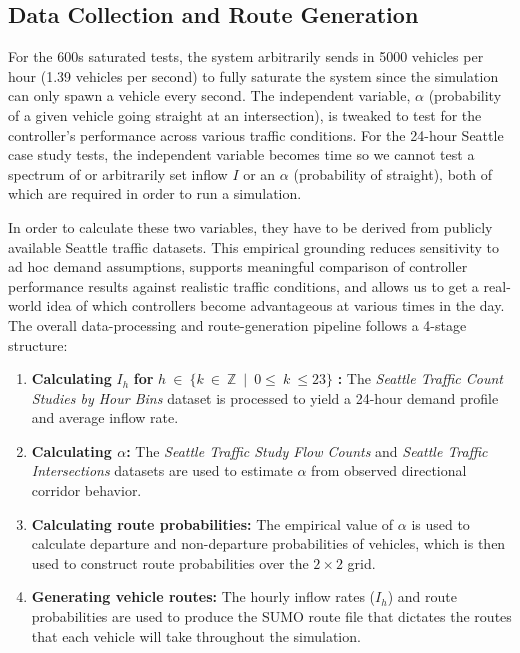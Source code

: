 \documentclass[12pt]{article}
\begin{document}
\subsection{Data Collection and Route Generation}

For the 600s saturated tests, the system arbitrarily sends in 5000 vehicles per hour (1.39 vehicles per second) to fully saturate the system since the simulation can only spawn a vehicle every second. The independent variable, $\alpha$ (probability of a given vehicle going straight at an intersection), is tweaked to test for the controller's performance across various traffic conditions. For the 24-hour Seattle case study tests, the independent variable becomes time so we cannot test a spectrum of or arbitrarily set inflow $I$ or an $\alpha$ (probability of straight), both of which are required in order to run a simulation.

In order to calculate these two variables, they have to be derived from publicly available Seattle traffic datasets. This empirical grounding reduces sensitivity to ad hoc demand assumptions, supports meaningful comparison of controller performance results against realistic traffic conditions, and allows us to get a real-world idea of which controllers become advantageous at various times in the day. The overall data-processing and route-generation pipeline follows a 4-stage structure:

\begin{enumerate}
\item \textbf{Calculating} $I_{h}$ \textbf{for} $h\  \in \ \{ k\  \in \ {\mathbb{Z}}\  \mid \ 0 \leq \ k\  \leq 23\}$ \textbf{:} The \emph{Seattle Traffic Count Studies by Hour Bins} dataset is processed to yield a 24-hour demand profile and average inflow rate.

\item \textbf{Calculating $\alpha$:} The \emph{Seattle Traffic Study Flow Counts} and \emph{Seattle Traffic Intersections} datasets are used to estimate $\alpha$ from observed directional corridor behavior.

\item \textbf{Calculating route probabilities:} The empirical value of $\alpha$ is used to calculate departure and non-departure probabilities of vehicles, which is then used to construct route probabilities over the $2 \times 2$ grid.

\item \textbf{Generating vehicle routes:} The hourly inflow rates ($I_{h}$) and route probabilities are used to produce the SUMO route file that dictates the routes that each vehicle will take throughout the simulation.

\end{enumerate}
\end{document}
